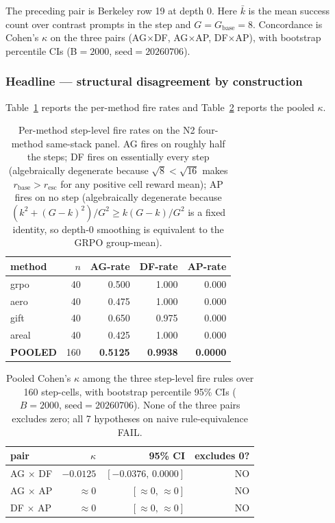 \noindent The preceding pair is Berkeley row 19 at depth 0. Here $\bar{k}$ is the mean success count over contrast
prompts in the step and $G = G_{\mathrm{base}} = 8$.  Concordance is
Cohen's $\kappa$ on the three pairs (AG$\times$DF, AG$\times$AP,
DF$\times$AP), with bootstrap percentile CIs (B$=2000$,
seed$=20260706$).

\subsubsection*{Headline --- structural disagreement by construction}

Table~\ref{tab:p7-iter195-rates} reports the per-method fire rates
and Table~\ref{tab:p7-iter195-kappa} reports the pooled $\kappa$.

\begin{table}[t]
\centering
\small
\begin{tabular}{lrrrr}
\toprule
method & $n$ & AG-rate & DF-rate & AP-rate \\
\midrule
grpo  & 40 & 0.500 & 1.000 & 0.000 \\
aero  & 40 & 0.475 & 1.000 & 0.000 \\
gift  & 40 & 0.650 & 0.975 & 0.000 \\
areal & 40 & 0.425 & 1.000 & 0.000 \\
\midrule
\textbf{POOLED} & 160 & \textbf{0.5125} & \textbf{0.9938} & \textbf{0.0000} \\
\bottomrule
\end{tabular}
\caption{Per-method step-level fire rates on the N2 four-method same-stack panel.  AG fires on roughly half the steps; DF fires on essentially every step (algebraically degenerate because $\sqrt{8} < \sqrt{16}$ makes $r_{\mathrm{base}} > r_{\mathrm{esc}}$ for any positive cell reward mean); AP fires on no step (algebraically degenerate because $(k^2 + (G-k)^2)/G^2 \ge k(G-k)/G^2$ is a fixed identity, so depth-0 smoothing is equivalent to the GRPO group-mean).}
\label{tab:p7-iter195-rates}
\end{table}

\begin{table}[t]
\centering
\small
\begin{tabular}{lrrr}
\toprule
pair & $\kappa$ & 95\% CI & excludes 0? \\
\midrule
AG $\times$ DF & $-0.0125$ & $[-0.0376,\, 0.0000]$ & NO \\
AG $\times$ AP & $\approx 0$ & $[\approx 0,\, \approx 0]$ & NO \\
DF $\times$ AP & $\approx 0$ & $[\approx 0,\, \approx 0]$ & NO \\
\bottomrule
\end{tabular}
\caption{Pooled Cohen's $\kappa$ among the three step-level fire rules over 160 step-cells, with bootstrap percentile 95\% CIs ($B{=}2000$, seed$=20260706$).  None of the three pairs excludes zero; all 7 hypotheses on naive rule-equivalence FAIL.}
\label{tab:p7-iter195-kappa}
\end{table}

